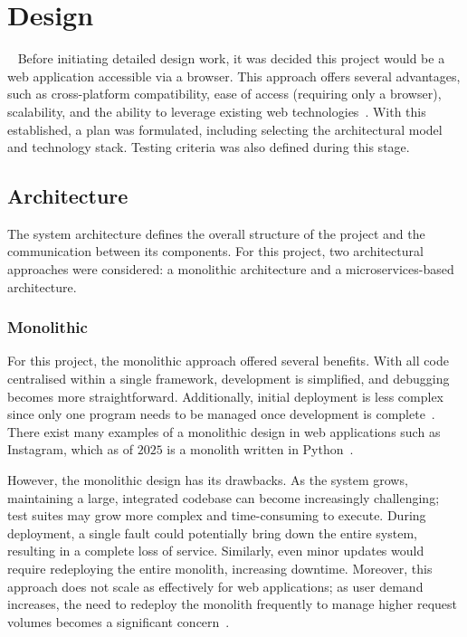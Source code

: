 \chapter{Design}~\label{cha:design}
Before initiating detailed design work, it was decided this project would be a web application accessible via a browser. This approach offers several advantages, such as cross-platform compatibility, ease of access (requiring only a browser), scalability, and the ability to leverage existing web technologies~\cite{6822300}. With this established, a plan was formulated, including selecting the architectural model and technology stack. Testing criteria was also defined during this stage.

\section{Architecture}
The system architecture defines the overall structure of the project and the communication between its components. For this project, two architectural approaches were considered: a monolithic architecture and a microservices-based architecture.

\subsection{Monolithic}
For this project, the monolithic approach offered several benefits. With all code centralised within a single framework, development is simplified, and debugging becomes more straightforward. Additionally, initial deployment is less complex since only one program needs to be managed once development is complete~\cite{9109514}. There exist many examples of a monolithic design in web applications such as Instagram, which as of $2025$ is a monolith written in Python~\cite{InstagramMonolith}.

However, the monolithic design has its drawbacks. As the system grows, maintaining a large, integrated codebase can become increasingly challenging; test suites may grow more complex and time-consuming to execute. During deployment, a single fault could potentially bring down the entire system, resulting in a complete loss of service. Similarly, even minor updates would require redeploying the entire monolith, increasing downtime. Moreover, this approach does not scale as effectively for web applications; as user demand increases, the need to redeploy the monolith frequently to manage higher request volumes becomes a significant concern~\cite{9109514}.

